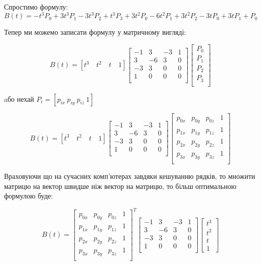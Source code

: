 \let\mypdfximage\pdfximage\def\pdfximage{\immediate\mypdfximage}\documentclass[14pt,a4paper]{extarticle}
\theoremstyle{definition}
\renewcommand{\[}{\begin{singlespace}\begin{equation*}}
\renewcommand{\]}{\end{equation*}\end{singlespace}}
\renewcommand{\+}{\discretionary{\mbox{\scriptsize$\hookleftarrow$}}{}{}}
\begin{document}
Спростимо формулу:
\begin{equation}
\label{eq:bezier_curve}
B(t) = -t^3P_0+3t^3P_1-3t^3P_2+t^3P_3 + 3t^2P_0-6t^2P_1+3t^2P_2 - 3tP_0+3tP_1 + P_0
\end{equation}

Тепер ми можемо записати формулу у матричному вигляді:
\[B(t)=[t^3\quad t^2\quad t\quad 1]\left[\begin{matrix}
-1 &  3 & -3 & 1 \\
 3 & -6 &  3 & 0 \\
-3 &  3 &  0 & 0 \\
 1 &  0 &  0 & 0 \\
\end{matrix}\right]\left[\begin{matrix}
P_0 \\ P_1 \\ P_2 \\ P_3 \\
\end{matrix}\right]\]
aбо нехай $P_i = [p_{ix}\ p_{iy}\ p_{iz}\ 1]$
\[B(t)=[t^3\quad t^2\quad t\quad 1]\left[\begin{matrix}
-1 &  3 & -3 & 1 \\
 3 & -6 &  3 & 0 \\
-3 &  3 &  0 & 0 \\
 1 &  0 &  0 & 0 \\
\end{matrix}\right]\left[\begin{matrix}
p_{0x} & p_{0y} & p_{0z} & 1 \\
p_{1x} & p_{1y} & p_{1z} & 1 \\
p_{2x} & p_{2y} & p_{2z} & 1 \\
p_{3x} & p_{3y} & p_{3z} & 1 \\
\end{matrix}\right]\]

Враховуючи що на сучасних комп'ютерах завдяки кешуванню рядків, то множити матрицю на вектор швидше ніж вектор на матрицю, то більш оптимальною формулою буде: 
\[B(t)=\left[\begin{matrix}
p_{0x} & p_{0y} & p_{0z} & 1 \\
p_{1x} & p_{1y} & p_{1z} & 1 \\
p_{2x} & p_{2y} & p_{2z} & 1 \\
p_{3x} & p_{3y} & p_{3z} & 1 \\
\end{matrix}\right]^T\left[\begin{matrix}
-1 &  3 & -3 & 1 \\
 3 & -6 &  3 & 0 \\
-3 &  3 &  0 & 0 \\
 1 &  0 &  0 & 0 \\
\end{matrix}\right]\left[\begin{matrix}t^3\\t^2\\t\\1\end{matrix}\right]\]
\end{document}
